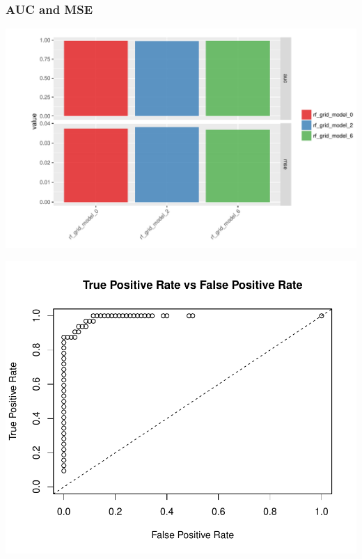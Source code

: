 \documentclass[handout, t, 11pt, xcolor=svgnames, hyperref={colorlinks,citecolor=DeepPink4,linkcolor=DarkRed,urlcolor=DarkBlue}]{beamer} %
\begin{document}
\begin{frame}
	\frametitle{AUC and MSE}
	
	\begin{center}\includegraphics[width=1\textwidth]{webinar_code_files/figure-latex/unnamed-chunk-29-1.pdf} \end{center}
	
	\begin{center}\includegraphics[width=1\textwidth]{webinar_code_files/figure-latex/unnamed-chunk-42-1} \end{center}
\end{frame}
\end{document}
